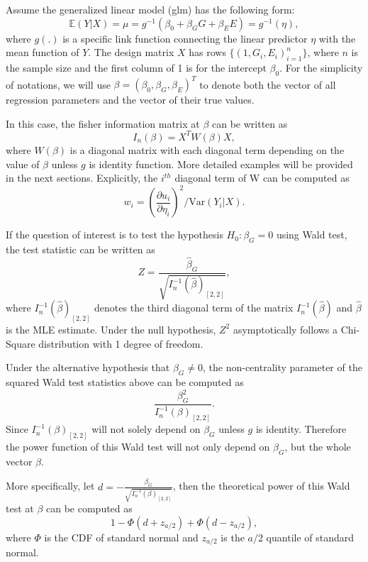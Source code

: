 \documentclass[
]{article}
\begin{document}
Assume the generalized linear model (glm) has the following form:
\[\mathbb{E}(Y|X) = \mu = g^{-1}(\beta_0 + \beta_G G + \beta_E E) = g^{-1}(\eta),\]
where \(g(.)\) is a specific link function connecting the linear
predictor \(\eta\) with the mean function of \(Y\). The design matrix
\(X\) has rows \(\{(1,G_i,E_i)_{i=1}^n\}\), where \(n\) is the sample
size and the first column of 1 is for the intercept \(\beta_0\). For the
simplicity of notations, we will use
\(\beta=(\beta_0,\beta_G,\beta_E)^T\) to denote both the vector of all
regression parameters and the vector of their true values.

In this case, the fisher information matrix at \(\beta\) can be written
as \[I_n(\beta) = X^TW(\beta) X,\] where \(W(\beta)\) is a diagonal
matrix with each diagonal term depending on the value of \(\beta\)
unless \(g\) is identity function. More detailed examples will be
provided in the next sections. Explicitly, the \(i^{th}\) diagonal term
of W can be computed as
\[w_i=(\frac{\partial u_i}{\partial\eta_i})^2/\text{Var}(Y_i|X).\]

If the question of interest is to test the hypothesis \(H_0: \beta_G=0\)
using Wald test, the test statistic can be written as
\[Z = \frac{\hat{\beta}_G}{\sqrt{I_n^{-1}(\hat{\beta})_{[2,2]}}},\]
where \(I_n^{-1}(\hat{\beta})_{[2,2]}\) denotes the third diagonal term
of the matrix \(I_n^{-1}(\hat{\beta})\) and \(\hat{\beta}\) is the MLE
estimate. Under the null hypothesis, \(Z^2\) asymptotically follows a
Chi-Square distribution with 1 degree of freedom.

Under the alternative hypothesis that \(\beta_G \neq 0\), the
non-centrality parameter of the squared Wald test statistics above can
be computed as \[\frac{\beta_G^2}{I_n^{-1}(\beta)_{[2,2]}}.\] Since
\(I_n^{-1}(\beta)_{[2,2]}\) will not solely depend on \(\beta_G\) unless
\(g\) is identity. Therefore the power function of this Wald test will
not only depend on \(\beta_G\), but the whole vector \(\beta\).

More specifically, let
\(d=-\frac{\beta_G}{\sqrt{I_n^{-1}(\beta)_{[2,2]}}}\), then the
theoretical power of this Wald test at \(\beta\) can be computed as
\[1-\Phi(d+z_{a/2})+\Phi(d-z_{a/2}),\] where \(\Phi\) is the CDF of
standard normal and \(z_{a/2}\) is the \(a/2\) quantile of standard
normal.
\end{document}
